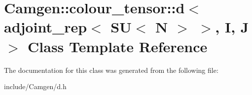 \hypertarget{a00115}{\section{Camgen\-:\-:colour\-\_\-tensor\-:\-:d$<$ adjoint\-\_\-rep$<$ S\-U$<$ N $>$ $>$, I, J $>$ Class Template Reference}
\label{a00115}
}


The documentation for this class was generated from the following file\-:\begin{DoxyCompactItemize}
\item 
include/\-Camgen/d.\-h\end{DoxyCompactItemize}
